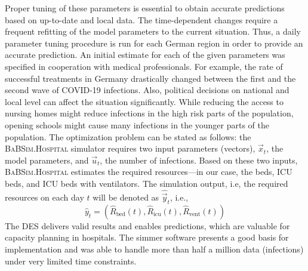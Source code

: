 \documentclass[conference]{IEEEtran}
\newcommand{\babsimhospital}{\textsc{BaBSim.Hospital}\xspace}
\begin{document}
Proper tuning of these parameters is essential to obtain accurate predictions based on up-to-date and local data. 
The time-dependent changes require a frequent refitting of the model parameters to the current situation.
Thus, a daily parameter tuning procedure is run for each German region in order to provide an accurate prediction.
An initial estimate for each of the given parameters was specified in cooperation with medical professionals. 
For example, the rate of successful treatments in Germany drastically changed between the first and the second wave of COVID-19 infections. 
Also, political decisions on national and local level can affect the situation significantly. 
While reducing the access to nursing homes might reduce infections in the high risk parts of the population, opening schools might cause many infections in the younger parts of the population. The optimization problem can be stated as follows:
the \babsimhospital simulator requires two input parameters (vectors), $\vec{x}_t$, the model parameters, and $\vec{u}_t$, the number of infections. Based on these two inputs, \babsimhospital estimates the required resources---in our case, the beds, \gls{ICU} beds,  and \gls{ICU} beds with ventilators.
The simulation output, i.e, the required resources on each day $t$ will be denoted as $\hat{\vec{y}}_t$, i.e., 
\begin{equation}\label{eq:haty}
\hat{y}_t = \left( \hat{R}_{\text{bed}}(t),   \hat{R}_{\text{icu}}(t), \hat{R}_{\text{vent}}(t) \right)
\end{equation}
The \gls{DES} delivers valid results and enables predictions, which are valuable for capacity planning in hospitals.
The \gls{simmer} software presents a good basis for implementation and was able to handle more than half a million data (infections) under very limited time constraints. 
\end{document}
